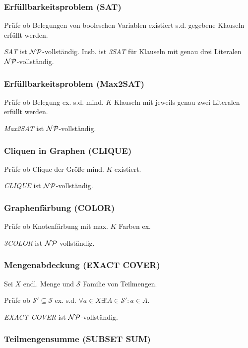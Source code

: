 \subsubsection*{Erfüllbarkeitsproblem (SAT)}

Prüfe ob Belegungen von booleschen Variablen existiert s.d. gegebene Klauseln erfüllt werden.

\spacing

\emph{SAT} ist $\mathcal{NP}$-vollständig. Insb. ist \emph{3SAT} für Klauseln mit genau drei Literalen $\mathcal{NP}$-vollständig.

\subsubsection*{Erfüllbarkeitsproblem (Max2SAT)}

Prüfe ob Belegung ex. s.d. mind. $K$ Klauseln mit jeweils genau zwei Literalen erfüllt werden.

\emph{Max2SAT} ist $\mathcal{NP}$-vollständig.

\subsubsection*{Cliquen in Graphen (CLIQUE)}

Prüfe ob Clique der Größe mind. $K$ existiert.

\emph{CLIQUE} ist $\mathcal{NP}$-vollständig.

\subsubsection*{Graphenfärbung (COLOR)}

Prüfe ob Knotenfärbung mit max. $K$ Farben ex.

\emph{3COLOR} ist $\mathcal{NP}$-vollständig.

\subsubsection*{Mengenabdeckung (EXACT COVER)}

Sei $X$ endl. Menge und $\mathcal{S}$ Familie von Teilmengen.

Prüfe ob $\mathcal{S}' \subseteq \mathcal{S}$ ex. s.d. $\forall a \in X \exists! A \in \mathcal{S}' : a \in A$.

\emph{EXACT COVER} ist $\mathcal{NP}$-vollständig.

\subsubsection*{Teilmengensumme (SUBSET SUM)}

